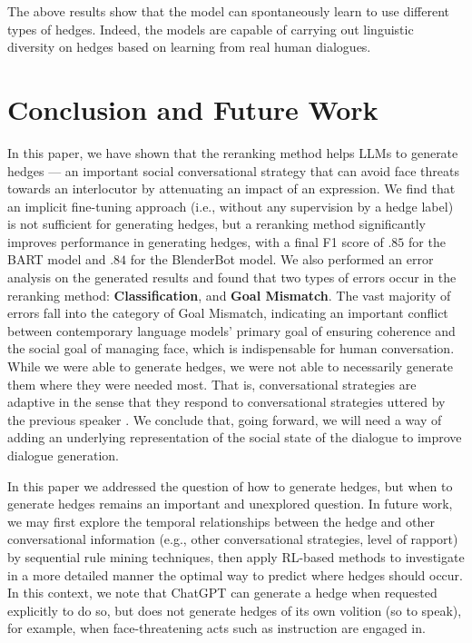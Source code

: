\documentclass[11pt]{article}
\begin{document}
The above results show that the model can spontaneously learn to use different types of hedges. Indeed, the models are capable of carrying out linguistic diversity on hedges based on learning from real human dialogues.


\section{Conclusion and Future Work}

In this paper, we have shown that the reranking method helps LLMs to generate hedges --- an important social conversational strategy that can avoid face threats towards an interlocutor by attenuating an impact of an expression. We find that an implicit fine-tuning approach (i.e., without any supervision by a hedge label) is not sufficient for generating hedges, but a reranking method significantly improves performance in generating hedges, with a final F1 score of $.85$ for the BART model and $.84$ for the BlenderBot model. We also performed an error analysis on the generated results and found that two types of errors occur in the reranking method: \textbf{Classification}, and \textbf{Goal Mismatch}. The vast majority of errors fall into the category of Goal Mismatch, indicating an important conflict between contemporary language models' primary goal of ensuring coherence and the social goal of managing face, which is indispensable for human conversation. While we were able to generate hedges, we were not able to necessarily generate them where they were needed most. That is, conversational strategies are adaptive in the sense that they respond to conversational strategies uttered by the previous speaker \citep{zhao2014towards}. We conclude that, going forward, we will need a way of adding an underlying representation of the social state of the dialogue to improve dialogue generation. 

In this paper we addressed the question of how to generate hedges, but when to generate hedges remains an important and unexplored question. In future work, we may first explore the temporal relationships between the hedge and other conversational information (e.g., other conversational strategies, level of rapport) by sequential rule mining techniques, then apply RL-based methods to investigate in a more detailed manner the optimal way to predict where hedges should occur.  In this context, we note that ChatGPT can generate a hedge when requested explicitly to do so, but does not generate hedges of its own volition (so to speak), for example, when face-threatening acts such as instruction are engaged in.
\end{document}
